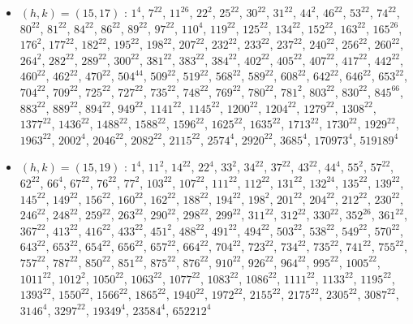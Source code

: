 \begin{itemize}
\item $(h,k)=(15,17)$ : $1^{4}$, $7^{22}$, $11^{26}$, $22^{2}$, $25^{22}$, $30^{22}$, $31^{22}$, $44^{2}$, $46^{22}$, $53^{22}$, $74^{22}$, $80^{22}$, $81^{22}$, $84^{22}$, $86^{22}$, $89^{22}$, $97^{22}$, $110^{4}$, $119^{22}$, $125^{22}$, $134^{22}$, $152^{22}$, $163^{22}$, $165^{26}$, $176^{2}$, $177^{22}$, $182^{22}$, $195^{22}$, $198^{22}$, $207^{22}$, $232^{22}$, $233^{22}$, $237^{22}$, $240^{22}$, $256^{22}$, $260^{22}$, $264^{2}$, $282^{22}$, $289^{22}$, $300^{22}$, $381^{22}$, $383^{22}$, $384^{22}$, $402^{22}$, $405^{22}$, $407^{22}$, $417^{22}$, $442^{22}$, $460^{22}$, $462^{22}$, $470^{22}$, $504^{44}$, $509^{22}$, $519^{22}$, $568^{22}$, $589^{22}$, $608^{22}$, $642^{22}$, $646^{22}$, $653^{22}$, $704^{22}$, $709^{22}$, $725^{22}$, $727^{22}$, $735^{22}$, $748^{22}$, $769^{22}$, $780^{22}$, $781^{2}$, $803^{22}$, $830^{22}$, $845^{66}$, $883^{22}$, $889^{22}$, $894^{22}$, $949^{22}$, $1141^{22}$, $1145^{22}$, $1200^{22}$, $1204^{22}$, $1279^{22}$, $1308^{22}$, $1377^{22}$, $1436^{22}$, $1488^{22}$, $1588^{22}$, $1596^{22}$, $1625^{22}$, $1635^{22}$, $1713^{22}$, $1730^{22}$, $1929^{22}$, $1963^{22}$, $2002^{4}$, $2046^{22}$, $2082^{22}$, $2115^{22}$, $2574^{4}$, $2920^{22}$, $3685^{4}$, $170973^{4}$, $519189^{4}$
\item $(h,k)=(15,19)$ : $1^{4}$, $11^{2}$, $14^{22}$, $22^{4}$, $33^{2}$, $34^{22}$, $37^{22}$, $43^{22}$, $44^{4}$, $55^{2}$, $57^{22}$, $62^{22}$, $66^{4}$, $67^{22}$, $76^{22}$, $77^{2}$, $103^{22}$, $107^{22}$, $111^{22}$, $112^{22}$, $131^{22}$, $132^{24}$, $135^{22}$, $139^{22}$, $145^{22}$, $149^{22}$, $156^{22}$, $160^{22}$, $162^{22}$, $188^{22}$, $194^{22}$, $198^{2}$, $201^{22}$, $204^{22}$, $212^{22}$, $230^{22}$, $246^{22}$, $248^{22}$, $259^{22}$, $263^{22}$, $290^{22}$, $298^{22}$, $299^{22}$, $311^{22}$, $312^{22}$, $330^{22}$, $352^{26}$, $361^{22}$, $367^{22}$, $413^{22}$, $416^{22}$, $433^{22}$, $451^{2}$, $488^{22}$, $491^{22}$, $494^{22}$, $503^{22}$, $538^{22}$, $549^{22}$, $570^{22}$, $643^{22}$, $653^{22}$, $654^{22}$, $656^{22}$, $657^{22}$, $664^{22}$, $704^{22}$, $723^{22}$, $734^{22}$, $735^{22}$, $741^{22}$, $755^{22}$, $757^{22}$, $787^{22}$, $850^{22}$, $851^{22}$, $875^{22}$, $876^{22}$, $910^{22}$, $926^{22}$, $964^{22}$, $995^{22}$, $1005^{22}$, $1011^{22}$, $1012^{2}$, $1050^{22}$, $1063^{22}$, $1077^{22}$, $1083^{22}$, $1086^{22}$, $1111^{22}$, $1133^{22}$, $1195^{22}$, $1393^{22}$, $1550^{22}$, $1566^{22}$, $1865^{22}$, $1940^{22}$, $1972^{22}$, $2155^{22}$, $2175^{22}$, $2305^{22}$, $3087^{22}$, $3146^{4}$, $3297^{22}$, $19349^{4}$, $23584^{4}$, $652212^{4}$

\end{itemize}
